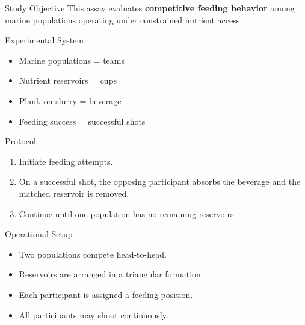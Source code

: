 \documentclass[12pt]{article}
\begin{document}
\begin{minipage}[t]{0.485\textwidth}
\vspace{0pt}
\begin{labbox}{Study Objective}
This assay evaluates \textbf{competitive feeding behavior} among marine populations operating under constrained nutrient access.
\end{labbox}

\begin{labbox}{Experimental System}
\begin{itemize}
\item Marine populations = teams
\item Nutrient reservoirs = cups
\item Plankton slurry = beverage
\item Feeding success = successful shots
\end{itemize}
\end{labbox}

\begin{labbox}{Protocol}
\begin{enumerate}
\item Initiate feeding attempts.
\item On a successful shot, the opposing participant absorbs the beverage and the matched reservoir is removed.
\item Continue until one population has no remaining reservoirs.
\end{enumerate}
\end{labbox}

\begin{labbox}{Operational Setup}
\begin{itemize}
\item Two populations compete head-to-head.
\item Reservoirs are arranged in a triangular formation.
\item Each participant is assigned a feeding position.
\item All participants may shoot continuously.
\end{itemize}
\end{labbox}

\end{minipage}\hfill
\end{document}

